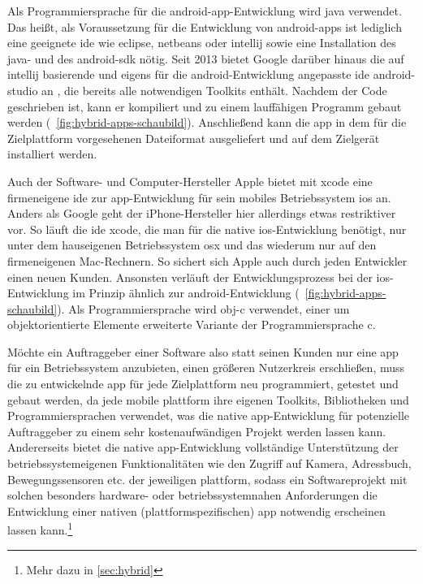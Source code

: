Als Programmiersprache für die \gls{android}-\gls{app}-Entwicklung wird \gls{java} verwendet. Das heißt, als Voraussetzung für die Entwicklung von \gls{android}-\glspl{app} ist lediglich eine geeignete \gls{ide} wie \gls{eclipse}, \gls{netbeans} oder \gls{intellij} sowie eine Installation des \gls{java}- und des \gls{android}-\gls{sdk} nötig. 
Seit 2013 bietet Google darüber hinaus die auf \gls{intellij} basierende und eigens für die \gls{android}-Entwicklung angepasste \gls{ide} \gls{android-studio} an \cite{android-studio}, die bereits alle notwendigen Toolkits enthält. 
Nachdem der Code geschrieben ist, kann er kompiliert und zu einem lauffähigen Programm gebaut werden (\seename\ \autoref{fig:hybrid-apps-schaubild}). Anschließend kann die \gls{app} in dem für die Zielplattform vorgesehenen Dateiformat ausgeliefert und auf dem Zielgerät installiert werden.

Auch der Software- und Computer-Hersteller Apple bietet mit \gls{xcode} eine firmeneigene \gls{ide} zur \gls{app}-Entwicklung für sein mobiles Betriebssystem \gls{ios} an. Anders als Google geht der iPhone-Hersteller hier allerdings etwas restriktiver vor. So läuft die \gls{ide} \gls{xcode}, die man für die native \gls{ios}-Entwicklung benötigt, nur unter dem hauseigenen Betriebssystem \gls{osx} und das wiederum nur auf den firmeneigenen Mac-Rechnern. So sichert sich Apple auch durch jeden Entwickler einen neuen Kunden. 
Ansonsten verläuft der Entwicklungsprozess bei der \gls{ios}-Entwicklung im Prinzip ähnlich zur \gls{android}-Entwicklung (\seename~\autoref{fig:hybrid-apps-schaubild}).
Als Programmiersprache wird \gls{obj-c} verwendet, einer um objektorientierte Elemente erweiterte Variante der Programmiersprache \gls{c}.

Möchte ein Auftraggeber einer Software also statt seinen Kunden nur eine \gls{app} für ein Betriebssystem anzubieten, einen größeren Nutzerkreis erschließen, muss die zu entwickelnde \gls{app} für jede Zielplattform neu programmiert, getestet und gebaut werden, da jede mobile \gls{plattform} ihre eigenen Toolkits, Bibliotheken und Programmiersprachen verwendet, was die native \gls{app}-Entwicklung für potenzielle Auftraggeber zu einem sehr kostenaufwändigen Projekt werden lassen kann.
Andererseits bietet die native \gls{app}-Entwicklung vollständige Unterstützung der betriebssystemeigenen Funktionalitäten wie den Zugriff auf Kamera, Adressbuch, Bewegungssensoren etc. der jeweiligen \gls{plattform}, sodass ein Softwareprojekt mit solchen besonders hardware- oder betriebssystemnahen Anforderungen die Entwicklung einer nativen (plattformspezifischen) \gls{app} notwendig erscheinen lassen kann.\footnote{Mehr dazu in \autoref{sec:hybrid}}

